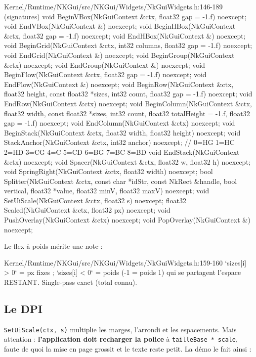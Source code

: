 \begin{nkcode}{Kernel/Runtime/NKGui/src/NKGui/Widgets/NkGuiWidgets.h:146-189 (signatures)}
void BeginVBox(NkGuiContext &ctx, float32 gap = -1.f) noexcept;   void EndVBox(NkGuiContext &) noexcept;
void BeginHBox(NkGuiContext &ctx, float32 gap = -1.f) noexcept;   void EndHBox(NkGuiContext &) noexcept;
void BeginGrid(NkGuiContext &ctx, int32 columns, float32 gap = -1.f) noexcept; void EndGrid(NkGuiContext &) noexcept;
void BeginGroup(NkGuiContext &ctx) noexcept;                      void EndGroup(NkGuiContext &) noexcept;
void BeginFlow(NkGuiContext &ctx, float32 gap = -1.f) noexcept;   void EndFlow(NkGuiContext &) noexcept;
void BeginRow(NkGuiContext &ctx, float32 height, const float32 *sizes, int32 count, float32 gap = -1.f) noexcept;
void EndRow(NkGuiContext &ctx) noexcept;
void BeginColumn(NkGuiContext &ctx, float32 width, const float32 *sizes, int32 count,
                 float32 totalHeight = -1.f, float32 gap = -1.f) noexcept;
void EndColumn(NkGuiContext &ctx) noexcept;
void BeginStack(NkGuiContext &ctx, float32 width, float32 height) noexcept;
void StackAnchor(NkGuiContext &ctx, int32 anchor) noexcept; // 0=HG 1=HC 2=HD 3=CG 4=C 5=CD 6=BG 7=BC 8=BD
void EndStack(NkGuiContext &ctx) noexcept;
void Spacer(NkGuiContext &ctx, float32 w, float32 h) noexcept;
void SpringRight(NkGuiContext &ctx, float32 width) noexcept;
bool Splitter(NkGuiContext &ctx, const char *idStr, const NkRect &handle, bool vertical,
              float32 *value, float32 minV, float32 maxV) noexcept;
void SetUiScale(NkGuiContext &ctx, float32 s) noexcept;
float32 Scaled(NkGuiContext &ctx, float32 px) noexcept;
void PushOverlay(NkGuiContext &ctx) noexcept;  void PopOverlay(NkGuiContext &) noexcept;
\end{nkcode}

Le flex à poids mérite une note :

\begin{nkcode}{Kernel/Runtime/NKGui/src/NKGui/Widgets/NkGuiWidgets.h:159-160}
`sizes[i] > 0` = px fixes ; `sizes[i] < 0` = poids (-1 = poids 1) qui se
partagent l'espace RESTANT. Single-pass exact (total connu).
\end{nkcode}

\subsection{Le DPI}

\texttt{SetUiScale(ctx, s)} multiplie les marges, l'arrondi et les espacements.
Mais attention : \textbf{l'application doit recharger la police} à
\texttt{tailleBase * scale}, faute de quoi la mise en page grossit et le texte
reste petit. La démo le fait ainsi :

